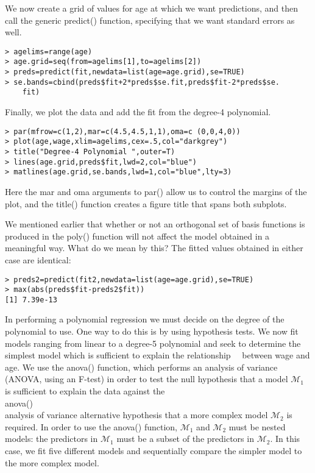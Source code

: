 \documentclass[10pt]{article}
\begin{document}
We now create a grid of values for age at which we want predictions, and then call the generic predict() function, specifying that we want standard errors as well.

\begin{verbatim}
> agelims=range(age)
> age.grid=seq(from=agelims[1],to=agelims[2])
> preds=predict(fit,newdata=list(age=age.grid),se=TRUE)
> se.bands=cbind(preds$fit+2*preds$se.fit,preds$fit-2*preds$se.
    fit)
\end{verbatim}

Finally, we plot the data and add the fit from the degree-4 polynomial.

\begin{verbatim}
> par(mfrow=c(1,2),mar=c(4.5,4.5,1,1),oma=c (0,0,4,0))
> plot(age,wage,xlim=agelims,cex=.5,col="darkgrey")
> title("Degree-4 Polynomial ",outer=T)
> lines(age.grid,preds$fit,lwd=2,col="blue")
> matlines(age.grid,se.bands,lwd=1,col="blue",lty=3)
\end{verbatim}

Here the mar and oma arguments to par() allow us to control the margins of the plot, and the title() function creates a figure title that spans both subplots.

We mentioned earlier that whether or not an orthogonal set of basis functions is produced in the poly() function will not affect the model obtained in a meaningful way. What do we mean by this? The fitted values obtained in either case are identical:

\begin{verbatim}
> preds2=predict(fit2,newdata=list(age=age.grid),se=TRUE)
> max(abs(preds$fit-preds2$fit))
[1] 7.39e-13
\end{verbatim}

In performing a polynomial regression we must decide on the degree of the polynomial to use. One way to do this is by using hypothesis tests. We now fit models ranging from linear to a degree-5 polynomial and seek to determine the simplest model which is sufficient to explain the relationship\
\
between wage and age. We use the anova() function, which performs an analysis of variance (ANOVA, using an F-test) in order to test the null hypothesis that a model $\mathcal{M}_{1}$ is sufficient to explain the data against the\\
anova()\\
analysis of variance alternative hypothesis that a more complex model $\mathcal{M}_{2}$ is required. In order to use the anova() function, $\mathcal{M}_{1}$ and $\mathcal{M}_{2}$ must be nested models: the predictors in $\mathcal{M}_{1}$ must be a subset of the predictors in $\mathcal{M}_{2}$. In this case, we fit five different models and sequentially compare the simpler model to the more complex model.
\end{document}
